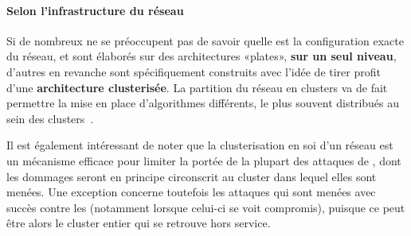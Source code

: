         \paragraph{Selon l'infrastructure du réseau}
Si de nombreux \IDS ne se préoccupent pas de savoir quelle est la configuration exacte du réseau, et sont élaborés sur des architectures «plates», \textbf{sur un seul niveau}, d'autres en revanche sont spécifiquement construits avec l'idée de tirer profit d'une \textbf{architecture clusterisée}.
La partition du réseau en clusters va de fait permettre la mise en place d'algorithmes différents, le plus souvent distribués au sein des clusters~\cite{SJ11}.

Il est également intéressant de noter que la clusterisation en soi d'un réseau est un mécanisme efficace pour limiter la portée de la plupart des attaques de \dds, dont les dommages seront en principe circonscrit au cluster dans lequel elles sont menées.
Une exception concerne toutefois les attaques qui sont menées avec succès contre les \ch (notamment lorsque celui-ci se voit compromis), puisque ce peut être alors le cluster entier qui se retrouve hors service.

